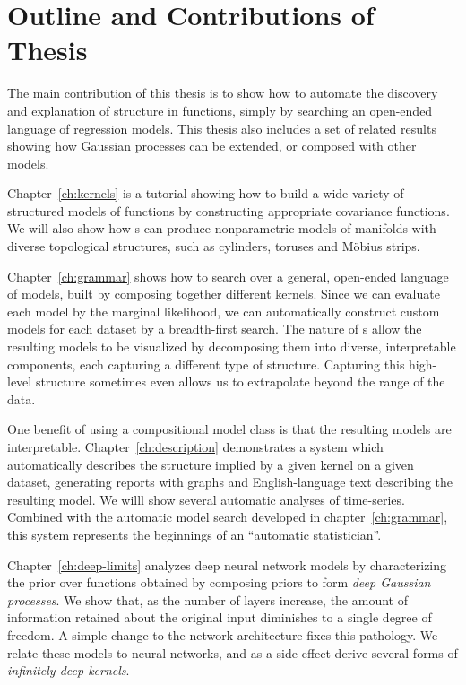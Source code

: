 \section{Outline and Contributions of Thesis}

The main contribution of this thesis is to show how to automate the discovery and explanation of structure in functions, simply by searching an open-ended language of regression models.
This thesis also includes a set of related results showing how Gaussian processes can be extended, or composed with other models.

Chapter~\ref{ch:kernels} is a tutorial showing how to build a wide variety of structured models of functions by constructing appropriate covariance functions.
We will also show how \gp{}s can produce nonparametric models of manifolds with diverse topological structures, such as cylinders, toruses and M\"obius strips.

Chapter~\ref{ch:grammar} shows how to search over a general, open-ended language of models, built by composing together different kernels.
Since we can evaluate each model by the marginal likelihood, we can automatically construct custom models for each dataset by a breadth-first search.
The nature of \gp{}s allow the resulting models to be visualized by decomposing them into diverse, interpretable components, each capturing a different type of structure.
Capturing this high-level structure sometimes even allows us to extrapolate beyond the range of the data.

One benefit of using a compositional model class is that the resulting models are interpretable.
Chapter~\ref{ch:description} demonstrates a system which automatically describes the structure implied by a given kernel on a given dataset, generating reports with graphs and English-language text describing the resulting model.
We willl show several automatic analyses of time-series.
Combined with the automatic model search developed in chapter~\ref{ch:grammar}, this system represents the beginnings of an ``automatic statistician''.

Chapter~\ref{ch:deep-limits} analyzes deep neural network models by characterizing the prior over functions obtained by composing \gp{} priors to form \emph{deep Gaussian processes}.
We show that, as the number of layers increase, the amount of information retained about the original input diminishes to a single degree of freedom.
A simple change to the network architecture fixes this pathology.
We relate these models to neural networks, and as a side effect derive several forms of \emph{infinitely deep kernels}.

